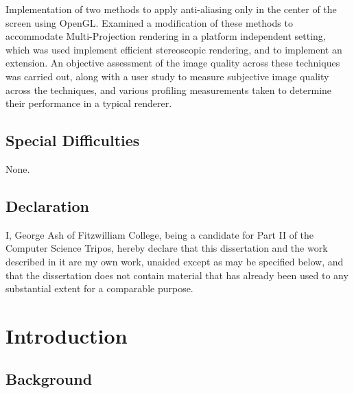 \documentclass[12pt,a4paper,twoside,openright]{report}
\begin{document}
Implementation of two methods to apply anti-aliasing only in the center of the screen using OpenGL. Examined a modification of these methods to accommodate Multi-Projection rendering in a platform independent setting, which was used implement efficient stereoscopic rendering, and to implement an extension. An objective assessment of the image quality across these techniques was carried out, along with a user study to measure subjective image quality across the techniques, and various profiling measurements taken to determine their performance in a typical renderer.   

\section*{Special Difficulties}

None.
 
\newpage
\section*{Declaration}

I, George Ash of Fitzwilliam College, being a candidate for Part II of the Computer
Science Tripos, hereby declare
that this dissertation and the work described in it are my own work,
unaided except as may be specified below, and that the dissertation
does not contain material that has already been used to any substantial
extent for a comparable purpose.

\bigskip
{}

\medskip
{}

\tableofcontents

\listoffigures


\pagestyle{headings}

\chapter{Introduction}

\section{Background}
\end{document}
